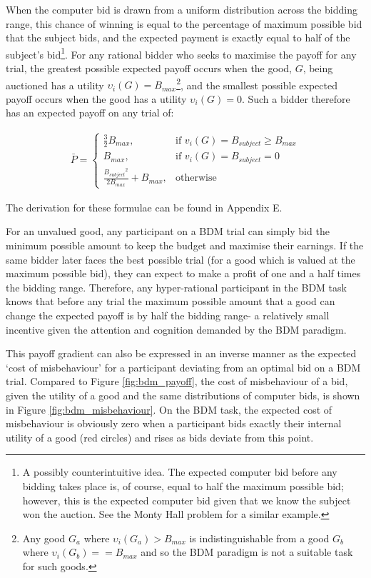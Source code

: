 When the computer bid is drawn from a uniform distribution across the bidding range, this chance of winning is equal to the percentage of maximum possible bid that the subject bids, and the expected payment is exactly equal to half of the subject's bid\footnote{A possibly counterintuitive idea. The expected computer bid before any bidding takes place is, of course, equal to half the maximum possible bid; however, this is the expected computer bid given that we know the subject won the auction. See the Monty Hall problem for a similar example.}. For any rational bidder who seeks to maximise the payoff for any trial, the greatest possible expected payoff occurs when the good, $G$, being auctioned has a utility $\upsilon_i (G) = B_{max}$\footnote{Any good $G_a$ where $\upsilon_i (G_a) > B_{max}$ is indistinguishable from a good $G_b$ where $\upsilon_i (G_b) == B_{max}$ and so the BDM paradigm is not a suitable task for such goods.}, and the smallest possible expected payoff occurs when the good has a utility $\upsilon_i (G) = 0$. Such a bidder therefore has an expected payoff on any trial of:

\begin{equation}
\begin{aligned}
\bar{P} = \begin{cases}
\frac{3}{2} B_{max}, & \text{if } v_i(G) = B_{subject} \geq B_{max} \\
B_{max}, & \text{if } v_i(G) = B_{subject} = 0 \\
\frac{{B_{subject}}^2}{2B_{max}} + B_{max}, & \text{otherwise}
\end{cases}
\end{aligned}
\label{eq:bdm_simulation_payoff2}
\end{equation}

The derivation for these formulae can be found in Appendix E.

For an unvalued good, any participant on a BDM trial can simply bid the minimum possible amount to keep the budget and maximise their earnings. If the same bidder later faces the best possible trial (for a good which is valued at the maximum possible bid), they can expect to make a profit of one and a half times the bidding range. Therefore, any hyper-rational participant in the BDM task knows that before any trial the maximum possible amount that a good can change the expected payoff is by half the bidding range- a relatively small incentive given the attention and cognition demanded by the BDM paradigm.

This payoff gradient can also be expressed in an inverse manner as the expected ‘cost of misbehaviour’ for a participant deviating from an optimal bid on a BDM trial. Compared to Figure \ref{fig:bdm_payoff}, the cost of misbehaviour of a bid, given the utility of a good and the same distributions of computer bids, is shown in Figure \ref{fig:bdm_misbehaviour}. On the BDM task, the expected cost of misbehaviour is obviously zero when a participant bids exactly their internal utility of a good (red circles) and rises as bids deviate from this point.


